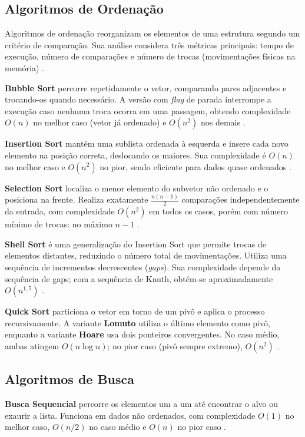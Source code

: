 \documentclass[12pt]{article}
\begin{document}
\subsection{Algoritmos de Ordenação}

Algoritmos de ordenação reorganizam os elementos de uma estrutura segundo um critério de comparação. Sua análise considera três métricas principais: tempo de execução, número de comparações e número de trocas (movimentações físicas na memória) \cite{cormen2002}.

\textbf{Bubble Sort} percorre repetidamente o vetor, comparando pares adjacentes e trocando-os quando necessário. A versão com \textit{flag} de parada interrompe a execução caso nenhuma troca ocorra em uma passagem, obtendo complexidade $O(n)$ no melhor caso (vetor já ordenado) e $O(n^2)$ nos demais \cite{ziviani2005}.

\textbf{Insertion Sort} mantém uma sublista ordenada à esquerda e insere cada novo elemento na posição correta, deslocando os maiores. Sua complexidade é $O(n)$ no melhor caso e $O(n^2)$ no pior, sendo eficiente para dados quase ordenados \cite{ziviani2005}.

\textbf{Selection Sort} localiza o menor elemento do subvetor não ordenado e o posiciona na frente. Realiza exatamente $\frac{n(n-1)}{2}$ comparações independentemente da entrada, com complexidade $O(n^2)$ em todos os casos, porém com número mínimo de trocas: no máximo $n-1$ \cite{cormen2002}.

\textbf{Shell Sort} é uma generalização do Insertion Sort que permite trocas de elementos distantes, reduzindo o número total de movimentações. Utiliza uma sequência de incrementos decrescentes (\textit{gaps}). Sua complexidade depende da sequência de gaps; com a sequência de Knuth, obtém-se aproximadamente $O(n^{1,5})$ \cite{sedgewick1996}.

\textbf{Quick Sort} particiona o vetor em torno de um pivô e aplica o processo recursivamente. A variante \textbf{Lomuto} utiliza o último elemento como pivô, enquanto a variante \textbf{Hoare} usa dois ponteiros convergentes. No caso médio, ambas atingem $O(n \log n)$; no pior caso (pivô sempre extremo), $O(n^2)$ \cite{cormen2002}.

\subsection{Algoritmos de Busca}

\textbf{Busca Sequencial} percorre os elementos um a um até encontrar o alvo ou exaurir a lista. Funciona em dados não ordenados, com complexidade $O(1)$ no melhor caso, $O(n/2)$ no caso médio e $O(n)$ no pior caso \cite{ziviani2005}.
\end{document}
